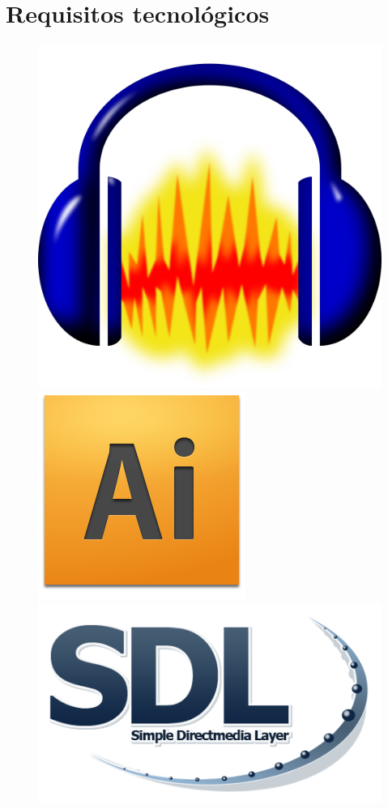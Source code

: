 \documentclass[11pt]{article} %
\begin{document}
\section{Requisitos tecnológicos}

\begin{figure}[!htp]
\begin{center}
  \includegraphics[scale=0.04]{res/audacity.png} \quad
  \includegraphics[scale=0.3]{res/adobe_illustrator.png} \quad
  \includegraphics[scale=0.25]{res/Sdl-logo.png} \quad

\end{center}
\end{figure}
\end{document}
